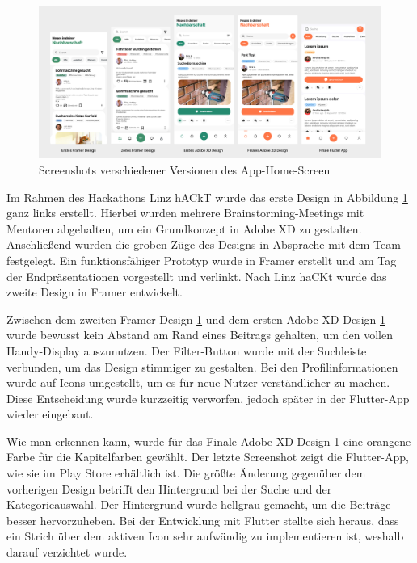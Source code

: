 \begin{figure}[H]
  \centering
  \includegraphics[width=1\textwidth]{pics/app-design-history.png}
  \caption{Screenshots verschiedener Versionen des App-Home-Screen}
  \label{fig:app-design-history}
\end{figure}
Im Rahmen des Hackathons Linz hACkT wurde das erste Design in Abbildung \ref{fig:app-design-history} ganz links erstellt. Hierbei wurden mehrere Brainstorming-Meetings mit Mentoren abgehalten, um ein Grundkonzept in Adobe XD zu gestalten. Anschließend wurden die groben Züge des Designs in Absprache mit dem Team festgelegt. Ein funktionsfähiger Prototyp wurde in Framer erstellt und am Tag der Endpräsentationen vorgestellt und verlinkt. Nach Linz haCKt wurde das zweite Design in Framer entwickelt.

Zwischen dem zweiten Framer-Design
\ref{fig:app-design-history} und dem ersten Adobe XD-Design
\ref{fig:app-design-history} wurde bewusst kein Abstand am
Rand eines Beitrags gehalten, um den vollen Handy-Display
auszunutzen. Der Filter-Button wurde mit der Suchleiste
verbunden, um das Design stimmiger zu gestalten. Bei den
Profilinformationen wurde auf Icons umgestellt, um es für
neue Nutzer verständlicher zu machen. Diese Entscheidung
wurde kurzzeitig verworfen, jedoch später in der Flutter-App
wieder eingebaut.

Wie man erkennen kann, wurde für das Finale Adobe
XD-Design \ref{fig:app-design-history} eine orangene Farbe für die Kapitelfarben
gewählt. Der letzte Screenshot zeigt die Flutter-App, wie
sie im Play Store erhältlich ist. Die größte Änderung
gegenüber dem vorherigen Design betrifft den Hintergrund
bei der Suche und der Kategorieauswahl. Der Hintergrund
wurde hellgrau gemacht, um die Beiträge besser hervorzuheben.
Bei der Entwicklung mit Flutter stellte sich heraus, dass
ein Strich über dem aktiven Icon sehr aufwändig zu
implementieren ist, weshalb darauf verzichtet wurde.




